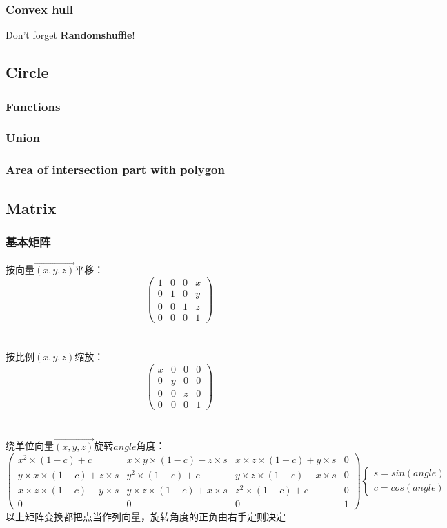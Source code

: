 \subsubsection{Convex hull}
Don't forget \textbf{Randomshuffle}!


\subsection{Circle}
\subsubsection{Functions}

\subsubsection{Union}

\subsubsection{Area of intersection part with polygon}


\subsection{Matrix}
\subsubsection{基本矩阵}
	按向量$\overrightarrow{(x,y,z)}$平移：
	\[\begin{pmatrix}
	1 & 0 & 0 & x\\ 
	0 & 1 & 0 & y\\ 
	0 & 0 & 1 & z\\ 
	0 & 0 & 0 & 1
	\end{pmatrix}\]\\
	\\
	按比例$(x,y,z)$缩放：
	\[\begin{pmatrix}
	x & 0 & 0 & 0\\ 
	0 & y & 0 & 0\\ 
	0 & 0 & z & 0\\ 
	0 & 0 & 0 & 1
	\end{pmatrix}\]\\
	\\
	绕单位向量$\overrightarrow{(x,y,z)}$旋转$angle$角度：
	\[\begin{pmatrix}
	x^2\times (1-c)+c & x\times y\times (1-c)-z\times s & x\times z\times (1-c)+y\times s & 0\\ 
	y\times x\times (1-c)+z\times s & y^2\times (1-c)+c & y\times z\times (1-c)-x\times s & 0\\ 
	x\times z\times (1-c)-y\times s & y\times z\times (1-c)+x\times s & z^2\times (1-c)+c & 0\\ 
	0 & 0 & 0 & 1
	\end{pmatrix}
	\begin{cases}
	s=sin(angle)\\
	c=cos(angle)
	\end{cases}\]
	以上矩阵变换都把点当作列向量，旋转角度的正负由右手定则决定\\

